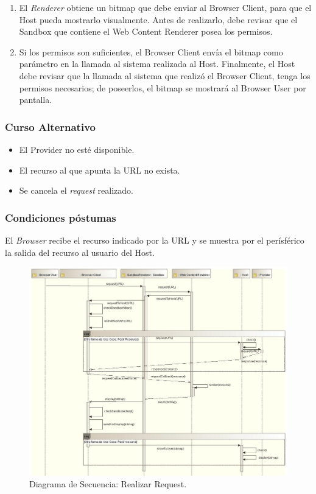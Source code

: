 \documentclass{sig-alternate-05-2015}
\begin{document}
\begin{enumerate}
        \item El \textit{Renderer} obtiene un bitmap que debe enviar al Browser Client, para que el Host pueda mostrarlo visualmente. Antes de realizarlo, debe revisar que el Sandbox que contiene el Web Content Renderer posea los permisos.
        \item Si los permisos son suficientes, el Browser Client envía el bitmap como parámetro en la llamada al sistema realizada al Host. Finalmente, el Host debe revisar que la llamada al sistema que realizó el Browser Client, tenga los permisos necesarios; de poseerlos, el bitmap se mostrará al Browser User por pantalla.
      \end{enumerate}
    \subsubsection*{Curso Alternativo} 
    \begin{itemize}
    \item El Provider no esté disponible.
    \item El recurso al que apunta la URL no exista.
    \item Se cancela el \textit{request} realizado.
      \end{itemize}
    \subsubsection*{Condiciones póstumas} El \textit{Browser} recibe el recurso indicado por la URL y se muestra por el perísférico la salida del recurso al usuario del Host.
      \begin{figure}[h!t]
          \centering
          \includegraphics[scale=0.61]{figures/requestResource_v2.jpg}
          \caption{Diagrama de Secuencia: Realizar Request.}
          \label{fig:SecReq}
      \end{figure}
\end{document}
